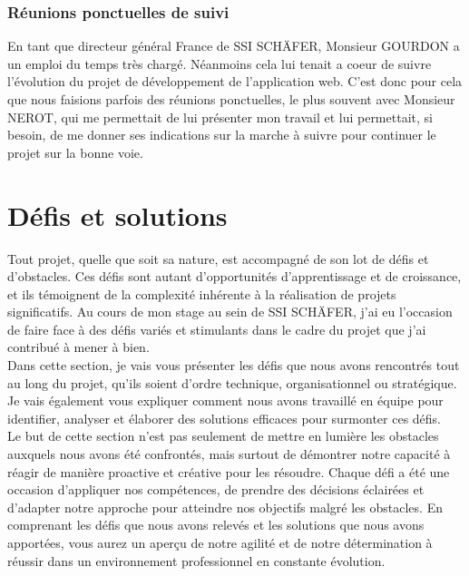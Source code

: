 \documentclass[a4paper, 12pt, french]{article}
\begin{document}
				\subsubsection{Réunions ponctuelles de suivi}
					En tant que directeur général France de SSI SCHÄFER, Monsieur GOURDON a un emploi du temps très chargé. Néanmoins cela lui tenait a coeur de suivre l'évolution du projet de développement de l'application web. C'est donc pour cela que nous faisions parfois des réunions ponctuelles, le plus souvent avec Monsieur NEROT, qui me permettait de lui présenter mon travail et lui permettait, si besoin, de me donner ses indications sur la marche à suivre pour continuer le projet sur la bonne voie.

		\newpage

		\section{Défis et solutions}
			Tout projet, quelle que soit sa nature, est accompagné de son lot de défis et d'obstacles. Ces défis sont autant d'opportunités d'apprentissage et de croissance, et ils témoignent de la complexité inhérente à la réalisation de projets significatifs. Au cours de mon stage au sein de SSI SCHÄFER, j'ai eu l'occasion de faire face à des défis variés et stimulants dans le cadre du projet que j'ai contribué à mener à bien.\\

			Dans cette section, je vais vous présenter les défis que nous avons rencontrés tout au long du projet, qu'ils soient d'ordre technique, organisationnel ou stratégique. Je vais également vous expliquer comment nous avons travaillé en équipe pour identifier, analyser et élaborer des solutions efficaces pour surmonter ces défis.\\

			Le but de cette section n'est pas seulement de mettre en lumière les obstacles auxquels nous avons été confrontés, mais surtout de démontrer notre capacité à réagir de manière proactive et créative pour les résoudre. Chaque défi a été une occasion d'appliquer nos compétences, de prendre des décisions éclairées et d'adapter notre approche pour atteindre nos objectifs malgré les obstacles. En comprenant les défis que nous avons relevés et les solutions que nous avons apportées, vous aurez un aperçu de notre agilité et de notre détermination à réussir dans un environnement professionnel en constante évolution.
\end{document}
